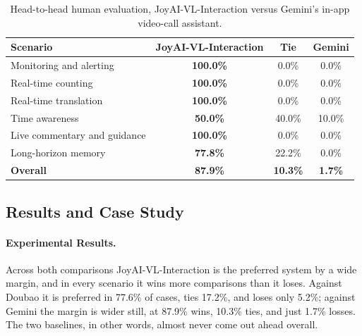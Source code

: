\documentclass{llmxive}
\providecommand{\arraystretch}{1.3}
\begin{document}
\begin{table}[!htbp]
\centering
\renewcommand{\arraystretch}{1.3}
\begin{tabular}{lccc}
\toprule
\textbf{Scenario} & \textbf{JoyAI-VL-Interaction} & \textbf{Tie} & \textbf{Gemini} \\
\midrule
Monitoring and alerting      & \textbf{100.0\%} & 0.0\%  & 0.0\%  \\
Real-time counting                & \textbf{100.0\%} & 0.0\%  & 0.0\%  \\
Real-time translation        & \textbf{100.0\%} & 0.0\%  & 0.0\%  \\
Time awareness               & \textbf{50.0\%}  & 40.0\% & 10.0\% \\
Live commentary and guidance & \textbf{100.0\%} & 0.0\%  & 0.0\%  \\
Long-horizon memory          & \textbf{77.8\%}  & 22.2\% & 0.0\%  \\
\midrule
\textbf{Overall}             & \textbf{87.9\%}  & \textbf{10.3\%} & \textbf{1.7\%} \\
\bottomrule
\end{tabular}
\caption{Head-to-head human evaluation, JoyAI-VL-Interaction versus Gemini's in-app video-call assistant.}
\end{table}




\subsection{Results and Case Study}

\paragraph{\textbf{Experimental Results.}}
Across both comparisons JoyAI-VL-Interaction is the preferred system by a wide margin, and in every scenario it wins more comparisons than it loses. Against Doubao it is preferred in 77.6\% of cases, ties 17.2\%, and loses only 5.2\%; against Gemini the margin is wider still, at 87.9\% wins, 10.3\% ties, and just 1.7\% losses. The two baselines, in other words, almost never come out ahead overall.
\end{document}

